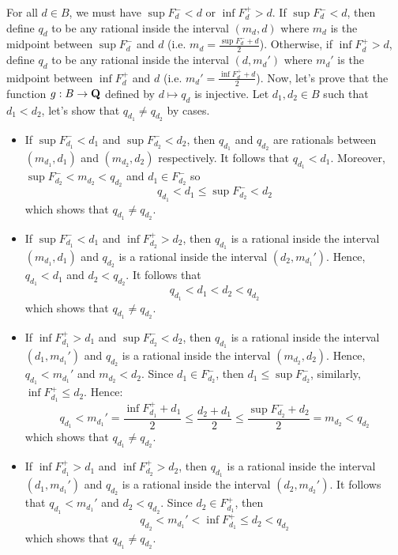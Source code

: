 \begin{solution}
    For all $d \in B$, we must have $\sup F_d^- < d$ or $\inf F_d^+ > d$. If $\sup F_d^- < d$, then define $q_d$ to be any rational inside the interval $(m_d, d)$ where $m_d$ is the midpoint between $\sup F_d^-$ and $d$ (i.e. $m_d = \frac{\sup F_d^- + d}{2}$). Otherwise, if $\inf F_d^+ > d$, define $q_d$ to be any rational inside the interval $(d, m_d')$ where $m_d'$ is the midpoint between $\inf F_d^+$ and $d$ (i.e. $m_d' = \frac{\inf F_d^+ + d}{2}$). Now, let's prove that the function $g : B \to \mathbf{Q}$ defined by $d \mapsto q_d$ is injective. Let $d_1, d_2 \in B$ such that $d_1 < d_2$, let's show that $q_{d_1} \neq q_{d_2}$ by cases.
    \begin{itemize}
        \item If $\sup F_{d_1}^- < d_1$ and $\sup F_{d_2}^- < d_2$, then $q_{d_1}$ and $q_{d_2}$ are rationals between $(m_{d_1}, d_1)$ and $(m_{d_2}, d_2)$ respectively. It follows that $q_{d_1} < d_1$. Moreover, $\sup F_{d_2}^- < m_{d_2} < q_{d_2}$ and $d_1 \in F_{d_2}^-$ so 
        $$q_{d_1} < d_1 \leq \sup F_{d_2}^- < d_2$$
        which shows that $q_{d_1} \neq q_{d_2}$.
        \item If $\sup F_{d_1}^- < d_1$ and $\inf F_{d_2}^+ > d_2$, then $q_{d_1}$ is a rational inside the interval $(m_{d_1}, d_1)$ and $q_{d_2}$ is a rational inside the interval $(d_2,m_{d_1}')$. Hence, $q_{d_1} < d_1$ and $d_2  < q_{d_2}$. It follows that
        $$q_{d_1} < d_1 < d_2  < q_{d_2}$$ 
        which shows that $q_{d_1} \neq q_{d_2}$.
        \item If $\inf F_{d_1}^+ > d_1$ and $\sup F_{d_2}^- < d_2$, then $q_{d_1}$ is a rational inside the interval $(d_1, m_{d_1}')$ and $q_{d_2}$ is a rational inside the interval $(m_{d_2}, d_2)$. Hence, $q_{d_1} < m_{d_1}'$ and $m_{d_2} < d_2$. Since $d_1 \in F_{d_2}^-$, then $d_1 \leq \sup F_{d_2}^-$, similarly, $\inf F_{d_1}^+ \leq d_2$. Hence:
        $$q_{d_1} < m_{d_1}' = \frac{\inf F_{d_1}^+ + d_1}{2} \leq \frac{d_2 + d_1}{2} \leq \frac{\sup F_{d_2}^- + d_2}{2} = m_{d_2} < q_{d_2}$$
        which shows that $q_{d_1} \neq q_{d_2}$.
        \item If $\inf F_{d_1}^+ > d_1$ and $\inf F_{d_2}^+ > d_2$, then $q_{d_1}$ is a rational inside the interval $(d_1, m_{d_1}')$ and $q_{d_2}$ is a rational inside the interval $(d_2, m_{d_2}')$. It follows that $q_{d_1} < m_{d_1}'$ and $d_2 < q_{d_2}$. Since $d_2 \in F_{d_1}^+$, then
        $$q_{d_2} < m_{d_1}' < \inf F_{d_1}^+ \leq d_2 < q_{d_2}$$
        which shows that $q_{d_1} \neq q_{d_2}$.
    \end{itemize}

\end{solution}

